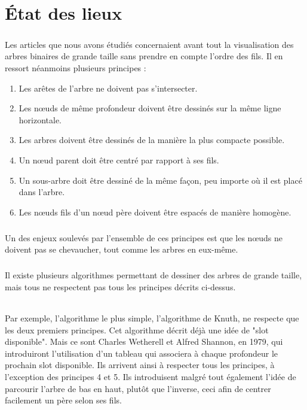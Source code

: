 \chapter{État des lieux}

\paragraph{}Les articles que nous avons étudiés concernaient avant tout la visualisation des arbres binaires de grande taille sans prendre en compte l'ordre des fils. Il en ressort néanmoins plusieurs principes :
\begin{enumerate}
	\item Les arêtes de l'arbre ne doivent pas s'intersecter.
	\item Les n\oe{}uds de même profondeur doivent être dessinés sur la même ligne horizontale.
	\item Les arbres doivent être dessinés de la manière la plus compacte possible.
	\item Un n\oe{}ud parent doit être centré par rapport à ses fils.
	\item Un sous-arbre doit être dessiné de la même façon, peu importe où il est placé dans l'arbre.
	\item Les n\oe{}uds fils d'un n\oe{}ud père doivent être espacés de manière homogène.
\end{enumerate}

\paragraph{}Un des enjeux soulevés par l'ensemble de ces principes est que les n\oe{}uds ne doivent pas se chevaucher, tout comme les arbres en eux-même.

\paragraph{}Il existe plusieurs algorithmes permettant de dessiner des arbres de grande taille, mais tous ne respectent pas tous les principes décrits ci-dessus.

\subparagraph{}Par exemple, l'algorithme le plus simple, l'algorithme de Knuth, ne respecte que les deux premiers principes. Cet algorithme décrit déjà une idée de "slot disponible". Mais ce sont Charles Wetherell et Alfred Shannon, en 1979, qui introduiront l'utilisation d'un tableau qui associera à chaque profondeur le prochain slot disponible. Ils arrivent ainsi à respecter tous les principes, à l'exception des principes 4 et 5. Ils introduisent malgré tout également l'idée de parcourir l'arbre de bas en haut, plutôt que l'inverse, ceci afin de centrer facilement un père selon ses fils.

